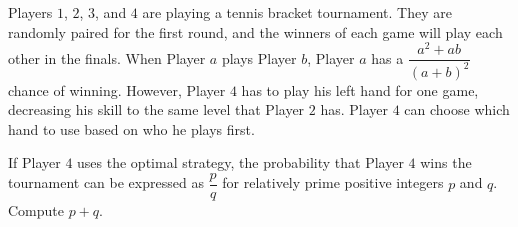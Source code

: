 Players $1$, $2$, $3$, and $4$ are playing a tennis bracket tournament. They are randomly paired for the first round, and the winners of each game will play each other in the finals. When Player $a$ plays Player $b$, Player $a$ has a $\dfrac{a^2+ab}{(a+b)^2}$ chance of winning. However, Player $4$ has to play his left hand for one game, decreasing his skill to the same level that Player $2$ has. Player $4$ can choose which hand to use based on who he plays first.

If Player $4$ uses the optimal strategy, the probability that Player $4$ wins the tournament can be expressed as $\dfrac{p}{q}$ for relatively prime positive integers $p$ and $q$. Compute $p+q$.
